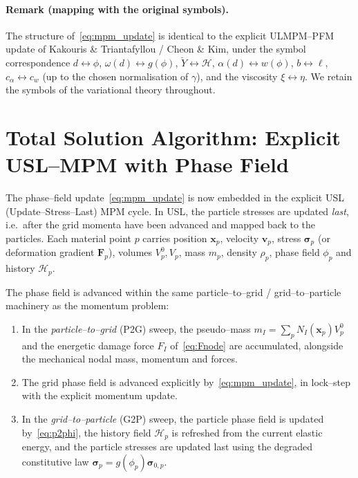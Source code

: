 \documentclass[12pt,a4paper]{article}
\newcommand{\eng}[1]{#1}
\newcommand{\bF}{\mathbf{F}}
\newcommand{\bsig}{\boldsymbol{\sigma}}
\newcommand{\bv}{\mathbf{v}}
\newcommand{\bx}{\mathbf{x}}
\begin{document}
	\paragraph{Remark (mapping with the original symbols).}
	The structure of~\eqref{eq:mpm_update} is identical to the explicit
	\eng{ULMPM--PFM} update of Kakouris \& Triantafyllou / Cheon \& Kim, under the
	symbol correspondence $d\leftrightarrow\phi$, $\omega(d)\leftrightarrow g(\phi)$,
	$\breve{Y}\leftrightarrow\mathcal{H}$, $\alpha(d)\leftrightarrow w(\phi)$,
	$b\leftrightarrow\ell$, $c_\alpha\leftrightarrow c_w$ (up to the chosen
	normalisation of $\gamma$), and the viscosity $\xi\leftrightarrow\eta$. We retain
	the symbols of the variational theory throughout.

	\section{Total Solution Algorithm: Explicit \eng{USL--MPM} with Phase Field}\label{sec:algo}

	The phase--field update~\eqref{eq:mpm_update} is now embedded in the explicit
	\eng{USL} (Update--Stress--Last) MPM cycle. In USL, the particle stresses are
	updated \emph{last}, i.e.\ after the grid momenta have been advanced and mapped
	back to the particles. Each material point $p$ carries position $\bx_p$,
	velocity $\bv_p$, stress $\bsig_p$ (or deformation gradient $\bF_p$), volumes
	$V_p^0,V_p$, mass $m_p$, density $\rho_p$, phase field $\phi_p$ and history
	$\mathcal{H}_p$.

	The phase field is advanced within the same particle--to--grid / grid--to--particle
	machinery as the momentum problem:
	\begin{enumerate}
		\item In the \emph{particle--to--grid} (P2G) sweep, the pseudo--mass
		$m_I=\sum_p N_I(\bx_p)V_p^0$ and the energetic damage force $F_I$
		of~\eqref{eq:Fnode} are accumulated, alongside the mechanical nodal mass,
		momentum and forces.
		\item The grid phase field is advanced explicitly by~\eqref{eq:mpm_update},
		in lock--step with the explicit momentum update.
		\item In the \emph{grid--to--particle} (G2P) sweep, the particle phase field is
		updated by~\eqref{eq:p2phi}, the history field $\mathcal{H}_p$ is refreshed
		from the current elastic energy, and the particle stresses are updated last
		using the degraded constitutive law $\bsig_p=g(\phi_p)\bsig_{0,p}$.
	\end{enumerate}
\end{document}
